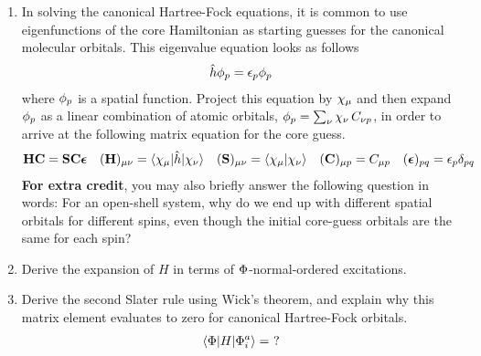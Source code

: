 \documentclass[11pt]{article}
\numberwithin{equation}{section}
\begin{document}
\begin{enumerate}
\item
  In solving the canonical Hartree-Fock equations, it is common to use eigenfunctions of the core Hamiltonian as starting guesses for the canonical molecular orbitals.
  This eigenvalue equation looks as follows
  \begin{align*}
    \hat{h}
    \phi _{p}
  =
    \epsilon _{p}
    \phi _{p}
  \end{align*}
  where $\phi _p$ is a spatial function.
  Project this equation by $\x_\mu$ and then expand $\phi _p$ as a linear combination of atomic orbitals, $\f_p=\sum_\nu \x_\nu\, C_{\nu p}$, in order to arrive at the following matrix equation for the core guess.
  \begin{align*}
    \bo{H}\bo{C}
  =
    \bo{S}\bo{C}\bm{\ev}
  &&
    (\bo{H})_{\mu\nu}
  =
    \ip{\x_\mu|\op{h}|\x_\nu}
  &&
    (\bo{S})_{\mu\nu}
  =
    \ip{\x_\mu|\x_\nu}
  &&
    (\bo{C})_{\mu p}
  =
    C_{\mu p}
  &&
    (\bm{\ev})_{pq}
  =
    \ev_p\d_{pq}
  \end{align*}
  \textbf{For extra credit}, you may also briefly answer the following question in words: For an open-shell system, why do we end up with different spatial orbitals for different spins, even though the initial core-guess orbitals are the same for each spin?



\newpage
\item
  Derive the expansion of $H$ in terms of $\Phi $-normal-ordered excitations.


\newpage
\item
  Derive the second Slater rule using Wick's theorem, and explain why this matrix element evaluates to zero for canonical Hartree-Fock orbitals.
  \begin{align*}
    \langle\Phi |H|\Phi _i^a\rangle
  =
    \,\,?
  \end{align*}
\end{enumerate}
\end{document}
